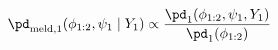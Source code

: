 \begin{equation}
  \pd_{\text{meld}, 1} (\phi_{1:2}, \psi_{1} \mid Y_{1}) \propto
  \frac {
    \pd_{1}(\phi_{1:2}, \psi_{1}, Y_{1})
  } {
    \pd_{1}(\phi_{1:2})
  }
  \label{eqn:stage-one-target}
\end{equation}